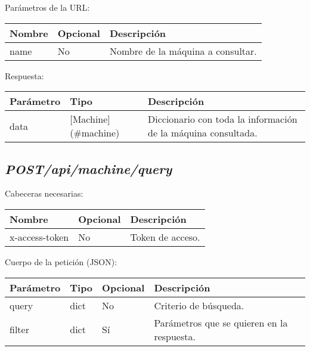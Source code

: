 Parámetros de la URL:
\begin{table}[h!]
	\centering
	\begin{adjustbox}{max width=\textwidth}
	\begin{tabular}{|l|l|l|}
		\hline
		Nombre & Opcional & Descripción \\ \hline
		name & No & Nombre de la máquina a consultar. \\ \hline
	\end{tabular}
\end{adjustbox}
\end{table}

Respuesta:
\begin{table}[h!]
	\centering
	\begin{adjustbox}{max width=\textwidth}
	\begin{tabular}{|l|l|l|}
		\hline
		Parámetro & Tipo & Descripción \\ \hline
		data & [Machine](\#machine) & Diccionario con toda la información de la máquina consultada. \\ \hline
	\end{tabular}
\end{adjustbox}
\end{table}



\subsection{\textit{POST/api/machine/query}}

Cabeceras necesarias:
\begin{table}[h!]
	\centering
	\begin{adjustbox}{max width=\textwidth}
	\begin{tabular}{|l|l|l|}
		\hline
		Nombre & Opcional & Descripción \\ \hline
		x-access-token & No & Token de acceso. \\ \hline
	\end{tabular}
\end{adjustbox}
\end{table}

Cuerpo de la petición (JSON):
\begin{table}[h!]
	\centering
	\begin{adjustbox}{max width=\textwidth}
	\begin{tabular}{|l|l|l|l|}
		\hline
		Parámetro & Tipo & Opcional & Descripción \\ \hline
		query & dict & No & Criterio de búsqueda. \\ \hline
		filter & dict & Sí & Parámetros que se quieren en la respuesta. \\ \hline
	\end{tabular}
\end{adjustbox}
\end{table}


